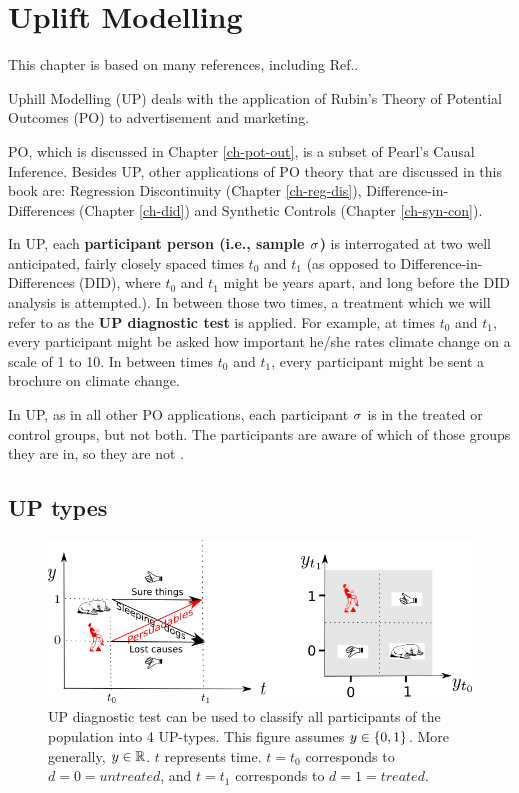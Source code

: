 \chapter{Uplift Modelling}
\label{ch-uplift}



This chapter is based 
on 
many references,
including Ref.\cite{uplift-2017, fei, wiki-uplift,jaros}.

Uphill Modelling (UP)
deals
with  the application of
Rubin's Theory of
Potential Outcomes (PO)
to advertisement and marketing.

PO, which is
discussed in Chapter \ref{ch-pot-out},
 is a subset
of Pearl's Causal Inference.
Besides UP, other  applications of PO theory
that are discussed in this book 
are: Regression Discontinuity (Chapter \ref{ch-reg-dis}),
Difference-in-Differences (Chapter \ref{ch-did})
and Synthetic Controls (Chapter \ref{ch-syn-con}).

In UP,
each {\bf participant person (i.e., sample $\sigma$)}
is interrogated at two well
anticipated, fairly closely spaced times
$t_0$ and $t_1$ (as opposed to 
Difference-in-Differences  (DID), where
$t_0$ and $t_1$ might
be years apart, and
long before the DID analysis is 
attempted.).
In between those two times,
a treatment which
we will refer to as the
{\bf UP diagnostic test} is applied.
For example,
at times $t_0$ and $t_1$,
every participant
might be asked
how important he/she rates climate 
change on a scale of 1 to 10.
In between times
$t_0$ and $t_1$,
every participant might
be sent a brochure on climate change.

In UP, as in all 
other PO applications, 
each participant
$\sigma$
is in the 
treated or control
groups, but not both.
The participants
are aware  of which
of those groups they are in,
so they are not .

\section{UP types}

\begin{figure}[h!]
\centering
\includegraphics[width=6in]
{uplift/uplift-y-t.png}
\caption{UP diagnostic test
can be used to classify
all participants of the
population into 4 UP-types.
This figure 
assumes $y\in \{0,1\}$.
More generally, $y\in { \mathbb{R}}$.
$t$ represents time. $t=t_0$
corresponds to $d=0=untreated$,
and $t=t_1$ corresponds to $d=1=treated$.} 
\label{fig-uplift-y-t}
\end{figure}

